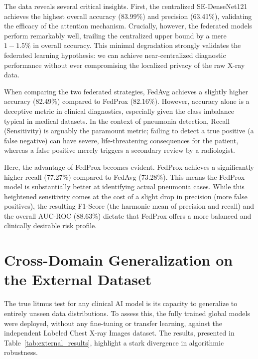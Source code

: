 \documentclass[12pt,a4paper]{report}
\begin{document}
The data reveals several critical insights. First, the centralized SE-DenseNet121 achieves the highest overall accuracy (83.99\%) and precision (63.41\%), validating the efficacy of the attention mechanism. Crucially, however, the federated models perform remarkably well, trailing the centralized upper bound by a mere $1-1.5\%$ in overall accuracy. This minimal degradation strongly validates the federated learning hypothesis: we can achieve near-centralized diagnostic performance without ever compromising the localized privacy of the raw X-ray data.

When comparing the two federated strategies, FedAvg achieves a slightly higher accuracy (82.49\%) compared to FedProx (82.16\%). However, accuracy alone is a deceptive metric in clinical diagnostics, especially given the class imbalance typical in medical datasets. In the context of pneumonia detection, Recall (Sensitivity) is arguably the paramount metric; failing to detect a true positive (a false negative) can have severe, life-threatening consequences for the patient, whereas a false positive merely triggers a secondary review by a radiologist. 

Here, the advantage of FedProx becomes evident. FedProx achieves a significantly higher recall (77.27\%) compared to FedAvg (73.28\%). This means the FedProx model is substantially better at identifying actual pneumonia cases. While this heightened sensitivity comes at the cost of a slight drop in precision (more false positives), the resulting F1-Score (the harmonic mean of precision and recall) and the overall AUC-ROC (88.63\%) dictate that FedProx offers a more balanced and clinically desirable risk profile.

\section{Cross-Domain Generalization on the External Dataset}

The true litmus test for any clinical AI model is its capacity to generalize to entirely unseen data distributions. To assess this, the fully trained global models were deployed, without any fine-tuning or transfer learning, against the independent Labeled Chest X-ray Images dataset. The results, presented in Table~\ref{tab:external_results}, highlight a stark divergence in algorithmic robustness.
\end{document}

